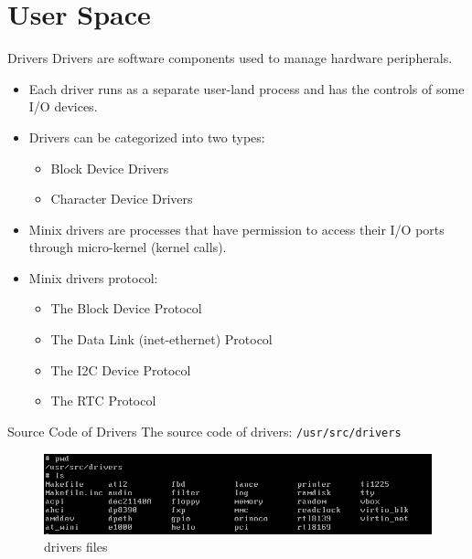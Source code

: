 \documentclass[12pt]{beamer}
\begin{document}
\section{User Space}
\begin{frame}{Drivers}
    Drivers are software components used to manage hardware peripherals\cite{minixdriver}.
    \begin{itemize}
        \item Each driver runs as a separate user-land process and has the controls of some I/O devices.
        \item Drivers can be categorized into two types:
        \begin{itemize}
            \item Block Device Drivers
            \item Character Device Drivers
        \end{itemize}
        \item Minix drivers are processes that have permission to access their I/O ports through micro-kernel (kernel calls).
        \item Minix drivers protocol:
        \begin{itemize}
            \item The Block Device Protocol
            \item The Data Link (inet-ethernet) Protocol
            \item The I2C Device Protocol
            \item The RTC Protocol
        \end{itemize}
    \end{itemize}
\end{frame}

\begin{frame}{Source Code of Drivers}
    The source code of drivers: \texttt{/usr/src/drivers}
    \begin{figure}[H]
        \centering
        \includegraphics[width=0.9\linewidth]{drivers.png}
        \caption{drivers files}
        \label{fig:drivers_png}
    \end{figure}
\end{frame}
\end{document}
